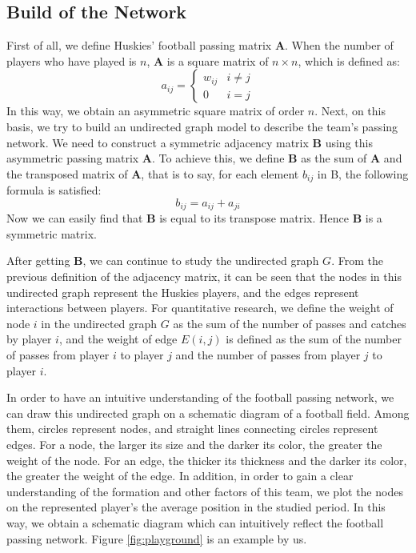\documentclass{mcmthesis}
\begin{document}
\subsection{Build of the Network}
	First of all, we define Huskies' football passing matrix $\textbf{A}$.  When the number of players who have played is $n$, $\textbf{A}$ is a square matrix of $n \times n$, which is defined as:
	\begin{equation}\label{eq:Mat_A}
		a_{ij} =
		\begin{cases}
			w_{ij}& \text{$i \neq j$}\\
			0& \text{$i = j$}
		\end{cases}
	\end{equation}
	In this way, we obtain an asymmetric square matrix of order $n$.  Next, on this basis, we try to build an undirected graph model to describe the team's passing network. We need to construct a symmetric adjacency matrix $\textbf{B}$ using this asymmetric passing matrix $\textbf{A}$.  To achieve this, we define $\textbf{B}$ as the sum of $\textbf{A}$ and the transposed matrix of $\textbf{A}$, that is to say, for each element $b_{ij}$ in B, the following formula is satisfied:
	\begin{equation}
		\label{eq:Mat_B}
		b_{ij} = a_{ij} + a_{ji}
	\end{equation}
	Now we can easily find that $\textbf{B}$ is equal to its transpose matrix.  Hence $\textbf{B}$ is a symmetric matrix.

	After getting $\textbf{B}$, we can continue to study the undirected graph $G$.  From the previous definition of the adjacency matrix, it can be seen that the nodes in this undirected graph represent the Huskies players, and the edges represent interactions between players.  For quantitative research, we define the weight of node $i$ in the undirected graph $G$ as the sum of the number of passes and catches by player $i$, and the weight of edge $E (i, j)$ is defined as the sum of the number of passes from player $i$ to player $j$ and the number of passes from player $j$ to player $i$.
	
	In order to have an intuitive understanding of the football passing network, we can draw this undirected graph on a schematic diagram of a football field.  Among them, circles represent nodes, and straight lines connecting circles represent edges.  For a node, the larger its size and the darker its color, the greater the weight of the node.  For an edge, the thicker its thickness and the darker its color, the greater the weight of the edge.  In addition, in order to gain a clear understanding of the formation and other factors of this team, we plot the nodes on the represented player's the average position in the studied period.  In this way, we obtain a schematic diagram which can intuitively reflect the football passing network.  Figure \ref{fig:playground} is an example by us.
	
\end{document}
